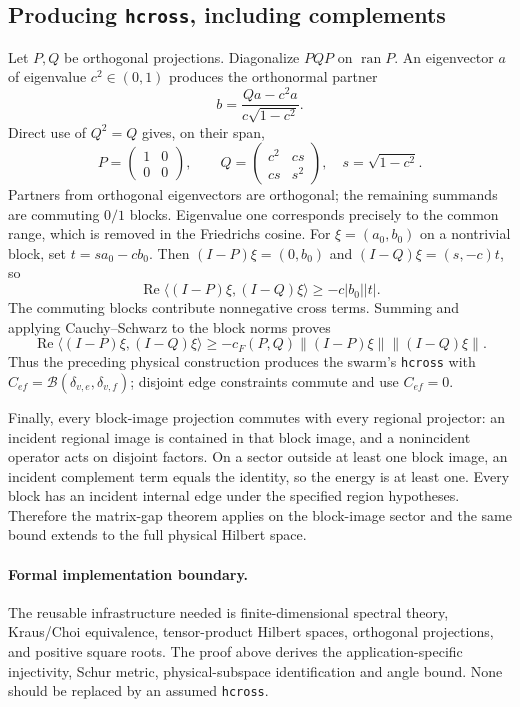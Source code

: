 \subsection{Producing \texttt{hcross}, including complements}
Let $P,Q$ be orthogonal projections. Diagonalize $PQP$ on
$\operatorname{ran}P$. An eigenvector $a$ of eigenvalue $c^2\in(0,1)$
produces the orthonormal partner
\[
 b=\frac{Qa-c^2a}{c\sqrt{1-c^2}}.
\]
Direct use of $Q^2=Q$ gives, on their span,
\[
 P=\begin{pmatrix}1&0\\0&0\end{pmatrix},\qquad
 Q=\begin{pmatrix}c^2&cs\\cs&s^2\end{pmatrix},\quad
 s=\sqrt{1-c^2}.
\]
Partners from orthogonal eigenvectors are orthogonal; the remaining
summands are commuting $0/1$ blocks. Eigenvalue one corresponds precisely
to the common range, which is removed in the Friedrichs cosine.
For $\xi=(a_0,b_0)$ on a nontrivial block, set $t=sa_0-cb_0$. Then
$(I-P)\xi=(0,b_0)$ and $(I-Q)\xi=(s,-c)t$, so
\[
 \operatorname{Re}\langle(I-P)\xi,(I-Q)\xi\rangle
 \ge-c|b_0||t|.
\]
The commuting blocks contribute nonnegative cross terms. Summing and
applying Cauchy--Schwarz to the block norms proves
\[
 \operatorname{Re}\langle(I-P)\xi,(I-Q)\xi\rangle
 \ge-c_F(P,Q)\|(I-P)\xi\|\|(I-Q)\xi\|.
\tag{HCROSS}
\]
Thus the preceding physical construction produces the swarm's
\texttt{hcross} with $C_{ef}=\mathcal B(\delta_{v,e},\delta_{v,f})$;
disjoint edge constraints commute and use $C_{ef}=0$.

Finally, every block-image projection commutes with every regional
projector: an incident regional image is contained in that block image,
and a nonincident operator acts on disjoint factors. On a sector outside
at least one block image, an incident complement term equals the
identity, so the energy is at least one. Every block has an incident
internal edge under the specified region hypotheses. Therefore the
matrix-gap theorem applies on the block-image sector and the same bound
extends to the full physical Hilbert space.

\paragraph{Formal implementation boundary.}
The reusable infrastructure needed is finite-dimensional spectral theory,
Kraus/Choi equivalence, tensor-product Hilbert spaces, orthogonal projections,
and positive square roots. The proof above derives the application-specific
injectivity, Schur metric, physical-subspace identification and angle bound.
None should be replaced by an assumed \texttt{hcross}.

